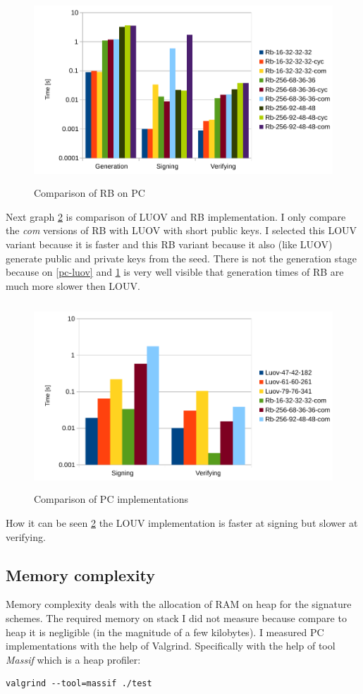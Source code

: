 \documentclass[thesis=M,english]{FITthesis}[2019/12/23]
\begin{document}
\begin{figure}[H]
\centering
\includegraphics[width=13cm,height=7cm]{images/pc-rb.pdf}
\caption{Comparison of RB on PC}
\label{pc-rb}
\end{figure}

\noindent
Next graph \ref{pc-all} is comparison of LUOV and RB implementation. I only compare the \textit{com} versions of RB with LUOV with short public keys. I selected this LOUV variant because it is faster and this RB variant because it also (like LUOV) generate public and private keys from the seed.
There is not the generation stage because on \ref{pc-luov} and \ref{pc-rb} is very well visible that generation times of RB are much more slower then LOUV. 

\begin{figure}[H]
\centering
\includegraphics[width=13cm,height=7cm]{images/pc-all.pdf}
\caption{Comparison of PC implementations}
\label{pc-all}
\end{figure}

\noindent
How it can be seen \ref{pc-all} the LOUV implementation is faster at signing but slower at verifying.

\subsection{Memory complexity}
Memory complexity deals with the allocation of RAM on heap for the signature schemes. The required memory on stack I did not measure because compare to heap it is negligible (in the magnitude of a few kilobytes). I measured PC implementations with the help of Valgrind. Specifically with the help of tool \textit{Massif} which is a heap profiler:
\begin{lstlisting}[frame=single]
valgrind --tool=massif ./test
\end{lstlisting}
\end{document}
